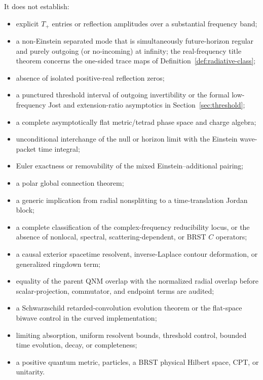 \documentclass[11pt]{article}
\theoremstyle{definition}
\theoremstyle{remark}
\begin{document}
It does not establish:
\begin{itemize}
\item explicit \(T_+\) entries or reflection amplitudes over a substantial
frequency band;
\item a non-Einstein separated mode that is simultaneously
future-horizon regular and purely outgoing (or no-incoming) at infinity;
the real-frequency title theorem concerns the one-sided trace maps of
Definition~\ref{def:radiative-class};
\item absence of isolated positive-real reflection zeros;
\item a punctured threshold interval of outgoing invertibility or the formal
low-frequency Jost and extension-ratio asymptotics in
Section~\ref{sec:threshold};
\item a complete asymptotically flat metric/tetrad phase space and charge
algebra;
\item unconditional interchange of the null or horizon limit with the
Einstein wave-packet time integral;
\item Euler exactness or removability of the mixed Einstein--additional
pairing;
\item a polar global connection theorem;
\item a generic implication from radial nonsplitting to a time-translation
Jordan block;
\item a complete classification of the complex-frequency reducibility locus,
or the absence of nonlocal, spectral, scattering-dependent, or BRST
\(C\) operators;
\item a causal exterior spacetime resolvent, inverse-Laplace contour
deformation, or generalized ringdown term;
\item equality of the parent QNM overlap with the normalized radial overlap
before scalar-projection, commutator, and endpoint terms are audited;
\item a Schwarzschild retarded-convolution evolution theorem or the
flat-space biwave control in the curved implementation;
\item limiting absorption, uniform resolvent bounds, threshold control,
bounded time evolution, decay, or completeness;
\item a positive quantum metric, particles, a BRST physical Hilbert space,
CPT, or unitarity.
\end{itemize}
\end{document}
